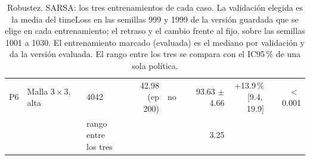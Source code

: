 \begin{table}[H]
\begin{tabular}{lllrlrrr}
P6 & \makecell[l]{Malla $3 \times 3$,\\{}alta} & 4042 & \makecell[r]{42.98\\{}(ep 200)} & no & \makecell[r]{93.63\\{}$\pm$ 4.66} & \makecell[r]{+13.9\,\%\\{}[9.4,\,19.9]} & $<$\,0.001 \\
 & & \makecell[l]{rango entre\\{}los tres} & & & 3.25 & & \\
\bottomrule
\end{tabular}
\caption[Robustez: entrenamientos de SARSA]{Robustez. SARSA: los tres entrenamientos de cada caso. La validación elegida es la media del timeLoss en las semillas 999 y 1999 de la versión guardada que se elige en cada entrenamiento; el retraso y el cambio frente al fijo, sobre las semillas 1001 a 1030. El entrenamiento marcado (evaluada) es el mediano por validación y da la versión evaluada. El rango entre los tres se compara con el IC95\,\% de una sola política.}
\label{tab:robustez-veredicto-bases-sarsa}
\end{table}


